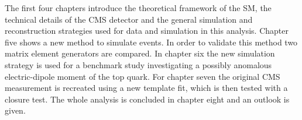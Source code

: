 The first four chapters introduce the theoretical framework of the SM, the technical details of the CMS detector and the general simulation and reconstruction strategies used for data and simulation in this analysis. Chapter five shows a new method to simulate \ttgamma events. In order to validate this method two matrix element generators are compared. In chapter six the new simulation strategy is used for a benchmark study investigating a possibly anomalous electric-dipole moment of the top quark. For chapter seven the original CMS \ttgamma measurement is recreated using a new template fit, which is then tested with a closure test. The whole analysis is concluded in chapter eight and an outlook is given. 